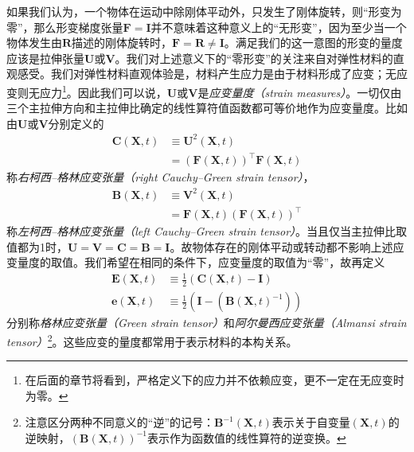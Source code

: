 \documentclass[main.tex]{subfiles}
\begin{document}
如果我们认为，一个物体在运动中除刚体平动外，只发生了刚体旋转，则“形变为零”，那么形变梯度张量$\mathbf{F}=\mathbf{I}$并不意味着这种意义上的“无形变”，因为至少当一个物体发生由$\mathbf{R}$描述的刚体旋转时，$\mathbf{F}=\mathbf{R}\neq\mathbf{I}$。满足我们的这一意图的形变的量度应该是拉伸张量$\mathbf{U}$或$\mathbf{V}$。我们对上述意义下的“零形变”的关注来自对弹性材料的直观感受。我们对弹性材料直观体验是，材料产生应力是由于材料形成了应变；无应变则无应力\footnote{在后面的章节将看到，严格定义下的应力并不依赖应变，更不一定在无应变时为零。}。因此我们可以说，$\mathbf{U}$或$\mathbf{V}$是\emph{应变量度（strain measures）}。一切仅由三个主拉伸方向和主拉伸比确定的线性算符值函数都可等价地作为应变量度\cite[Sect.32]{Truesdell1960}。比如由$\mathbf{U}$或$\mathbf{V}$分别定义的
\begin{align*}
    \mathbf{C}\left(\mathbf{X},t\right) & \equiv\mathbf{U}^2\left(\mathbf{X},t\right)                                                    \\
                                        & =\left(\mathbf{F}\left(\mathbf{X},t\right)\right)^\intercal\mathbf{F}\left(\mathbf{X},t\right)
\end{align*}
称\emph{右柯西--格林应变张量（right Cauchy--Green strain tensor）}，
\begin{align*}
    \mathbf{B}\left(\mathbf{X},t\right) & \equiv\mathbf{V}^2\left(\mathbf{X},t\right)                                                    \\
                                        & =\mathbf{F}\left(\mathbf{X},t\right)\left(\mathbf{F}\left(\mathbf{X},t\right)\right)^\intercal
\end{align*}
称\emph{左柯西--格林应变张量（left Cauchy--Green strain tensor）}。当且仅当主拉伸比取值都为1时，$\mathbf{U}=\mathbf{V}=\mathbf{C}=\mathbf{B}=\mathbf{I}$。故物体存在的刚体平动或转动都不影响上述应变量度的取值。我们希望在相同的条件下，应变量度的取值为“零”，故再定义
\begin{align*}
    \mathbf{E}\left(\mathbf{X},t\right) & \equiv\frac{1}{2}\left(\mathbf{C}\left(\mathbf{X},t\right)-\mathbf{I}\right)                   \\
    \mathbf{e}\left(\mathbf{X},t\right) & \equiv\frac{1}{2}\left(\mathbf{I}-\left(\mathbf{B}\left(\mathbf{X},t\right)^{-1}\right)\right)
\end{align*}
分别称\emph{格林应变张量（Green strain tensor）}和\emph{阿尔曼西应变张量（Almansi strain tensor）}\footnote{注意区分两种不同意义的“逆”的记号：$\mathbf{B}^{-1}\left(\mathbf{X},t\right)$表示关于自变量$\left(\mathbf{X},t\right)$的逆映射，$\left(\mathbf{B}\left(\mathbf{X},t\right)\right)^{-1}$表示作为函数值的线性算符的逆变换。}。这些应变的量度都常用于表示材料的本构关系。
\end{document}

